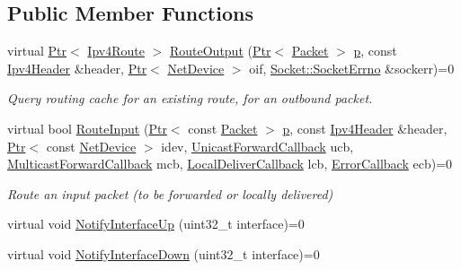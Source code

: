 \subsection*{Public Member Functions}
\begin{DoxyCompactItemize}
\item 
virtual \hyperlink{classns3_1_1Ptr}{Ptr}$<$ \hyperlink{classns3_1_1Ipv4Route}{Ipv4\+Route} $>$ \hyperlink{classns3_1_1Ipv4RoutingProtocol_a9c0e9b77772a4974c06ee4577fe60547}{Route\+Output} (\hyperlink{classns3_1_1Ptr}{Ptr}$<$ \hyperlink{classns3_1_1Packet}{Packet} $>$ \hyperlink{lte__link__budget__x2__handover__measures_8m_ac9de518908a968428863f829398a4e62}{p}, const \hyperlink{classns3_1_1Ipv4Header}{Ipv4\+Header} \&header, \hyperlink{classns3_1_1Ptr}{Ptr}$<$ \hyperlink{classns3_1_1NetDevice}{Net\+Device} $>$ oif, \hyperlink{classns3_1_1Socket_ada1328c5ae0c28cb2a982caf8f6d6cca}{Socket\+::\+Socket\+Errno} \&sockerr)=0
\begin{DoxyCompactList}\small\item\em Query routing cache for an existing route, for an outbound packet. \end{DoxyCompactList}\item 
virtual bool \hyperlink{classns3_1_1Ipv4RoutingProtocol_a67e815ff40ebb9f5f4eec4e22e23132e}{Route\+Input} (\hyperlink{classns3_1_1Ptr}{Ptr}$<$ const \hyperlink{classns3_1_1Packet}{Packet} $>$ \hyperlink{lte__link__budget__x2__handover__measures_8m_ac9de518908a968428863f829398a4e62}{p}, const \hyperlink{classns3_1_1Ipv4Header}{Ipv4\+Header} \&header, \hyperlink{classns3_1_1Ptr}{Ptr}$<$ const \hyperlink{classns3_1_1NetDevice}{Net\+Device} $>$ idev, \hyperlink{classns3_1_1Ipv4RoutingProtocol_a3453a85764cbbb1e704da7e919aa5d19}{Unicast\+Forward\+Callback} ucb, \hyperlink{classns3_1_1Ipv4RoutingProtocol_a26e76f7a555462e6c08fceda64a99d58}{Multicast\+Forward\+Callback} mcb, \hyperlink{classns3_1_1Ipv4RoutingProtocol_aa6ffa0159cb143daa3c46d2ba69bb1b9}{Local\+Deliver\+Callback} lcb, \hyperlink{classns3_1_1Ipv4RoutingProtocol_a0348285418c30d5021b08f7a68af21ea}{Error\+Callback} ecb)=0
\begin{DoxyCompactList}\small\item\em Route an input packet (to be forwarded or locally delivered) \end{DoxyCompactList}\item 
virtual void \hyperlink{classns3_1_1Ipv4RoutingProtocol_aabb99ce7a048e75ff4b36fa9af8745e4}{Notify\+Interface\+Up} (uint32\+\_\+t interface)=0
\item 
virtual void \hyperlink{classns3_1_1Ipv4RoutingProtocol_a90f728b73ccb1806e5a4093ff156f607}{Notify\+Interface\+Down} (uint32\+\_\+t interface)=0

\end{DoxyCompactItemize}
